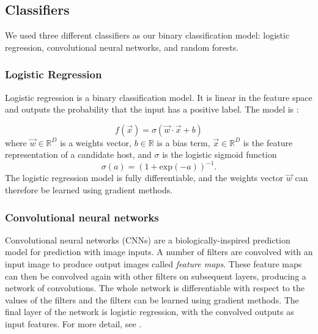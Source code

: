 \documentclass[fleqn,usenatbib,usedcolumn]{mnras}
\begin{document}
  \subsection{Classifiers}\label{sec:classifiers}

    We used three different classifiers as our binary classification model:
    logistic regression, convolutional neural networks, and random forests.

    \subsubsection{Logistic Regression}
    \label{sec:logistic-regression}
      Logistic regression is a binary classification model. It is linear in the
      feature space and outputs the probability that the input has a positive
      label. The model is \citep{bishop06ml}:

      \begin{equation}
          f(\vec x) = \sigma(\vec w \cdot \vec x + b)
      \end{equation}
      where $\vec w \in \mathbb{R}^D$ is a weights vector,
      $b \in \mathbb{R}$ is a bias term, $\vec x \in \mathbb{R}^D$ is the
      feature representation of a candidate host, and $\sigma$ is the
      logistic sigmoid function \begin{equation}
          \sigma(a) = (1 + \mathrm{exp}(-a))^{-1}.
      \end{equation}%
      The logistic regression model is fully differentiable, and the weights
      vector $\vec w$ can therefore be learned using gradient methods.

    \subsubsection{Convolutional neural networks}
    \label{sec:convolutional-neural-networks}

      Convolutional neural networks (CNNs) are a biologically-inspired
      prediction model for prediction with image inputs. A number of filters are
      convolved with an input image to produce output images called
      \emph{feature maps}. These feature maps can then be convolved again with
      other filters on subsequent layers, producing a network of convolutions.
      The whole network is differentiable with respect to the values of the
      filters and the filters can be learned using gradient methods. The final
      layer of the network is logistic regression, with the convolved outputs as
      input features. For more detail, see \citet[subsection II.A][]{lecun98}.
\end{document}

